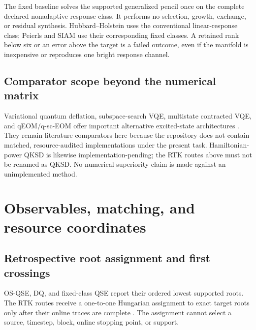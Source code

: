 \documentclass[
  reprint,
  amsmath,
  amssymb,
  aps,
  pra,
  nofootinbib,
  superscriptaddress,
  floatfix
]{revtex4-2}
\begin{document}
The fixed baseline solves the supported generalized pencil once on the
complete declared nonadaptive response class.  It performs no selection,
growth, exchange, or residual synthesis.  Hubbard--Holstein uses the
conventional linear-response class; Peierls and SIAM use their corresponding
fixed classes.  A retained rank below six or an error above the target is a
failed outcome, even if the manifold is inexpensive or reproduces one bright
response channel.

\subsection{Comparator scope beyond the numerical matrix}

Variational quantum deflation, subspace-search VQE, multistate contracted VQE,
and qEOM/q-sc-EOM offer important alternative excited-state architectures
\cite{Higgott2019VQD,Nakanishi2019SSVQE,Parrish2019MCVQE,
Ollitrault2020qEOM,AsthanaKumar2023QScEOM}.  They remain literature
comparators here because the repository does not contain matched,
resource-audited implementations under the present task.  Hamiltonian-power
QKSD is likewise implementation-pending; the RTK routes above must not be
renamed as QKSD.  No numerical superiority claim is made against an
unimplemented method.

\section{Observables, matching, and resource coordinates}
\label{sec:evaluation}

\subsection{Retrospective root assignment and first crossings}

OS-QSE, DQ, and fixed-class QSE report their ordered lowest supported roots.
The RTK routes receive a one-to-one Hungarian assignment to exact target roots
only after their online traces are complete \cite{Kuhn1955Hungarian}.  The
assignment cannot select a source, timestep, block, online stopping point, or
support.
\end{document}
